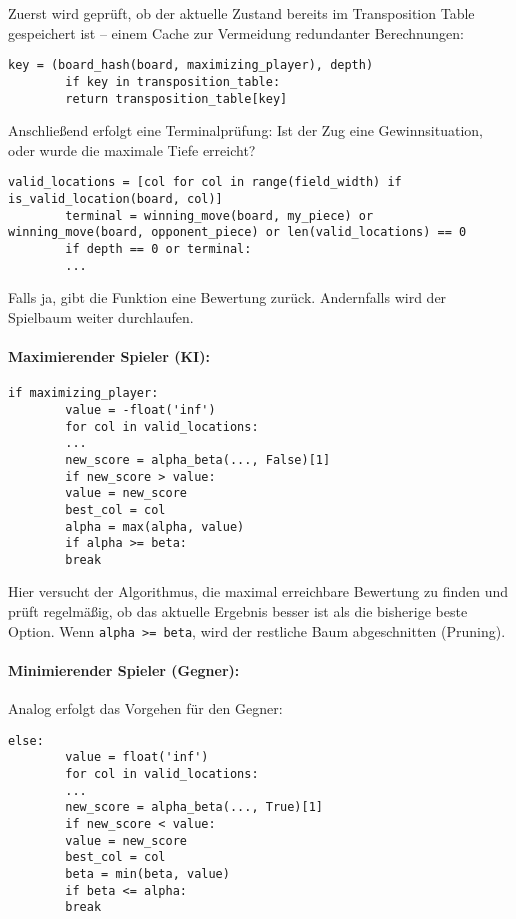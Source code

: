 	Zuerst wird geprüft, ob der aktuelle Zustand bereits im Transposition Table gespeichert ist – einem Cache zur Vermeidung redundanter Berechnungen:
	
	\begin{lstlisting}[style=pythonstyle]
		key = (board_hash(board, maximizing_player), depth)
		if key in transposition_table:
		return transposition_table[key]
	\end{lstlisting}
	
	Anschließend erfolgt eine Terminalprüfung: Ist der Zug eine Gewinnsituation, oder wurde die maximale Tiefe erreicht?
	
	\begin{lstlisting}[style=pythonstyle]
		valid_locations = [col for col in range(field_width) if is_valid_location(board, col)]
		terminal = winning_move(board, my_piece) or winning_move(board, opponent_piece) or len(valid_locations) == 0
		if depth == 0 or terminal:
		...
	\end{lstlisting}
	
	Falls ja, gibt die Funktion eine Bewertung zurück. Andernfalls wird der Spielbaum weiter durchlaufen.
	
	\paragraph*{Maximierender Spieler (KI):}
	
	\begin{lstlisting}[style=pythonstyle]
		if maximizing_player:
		value = -float('inf')
		for col in valid_locations:
		...
		new_score = alpha_beta(..., False)[1]
		if new_score > value:
		value = new_score
		best_col = col
		alpha = max(alpha, value)
		if alpha >= beta:
		break
	\end{lstlisting}
	
	Hier versucht der Algorithmus, die maximal erreichbare Bewertung zu finden und prüft regelmäßig, ob das aktuelle Ergebnis besser ist als die bisherige beste Option. Wenn \texttt{alpha >= beta}, wird der restliche Baum abgeschnitten (Pruning).
	
	\paragraph*{Minimierender Spieler (Gegner):}
	
	Analog erfolgt das Vorgehen für den Gegner:
	
	\begin{lstlisting}[style=pythonstyle]
		else:
		value = float('inf')
		for col in valid_locations:
		...
		new_score = alpha_beta(..., True)[1]
		if new_score < value:
		value = new_score
		best_col = col
		beta = min(beta, value)
		if beta <= alpha:
		break
	\end{lstlisting}
	
